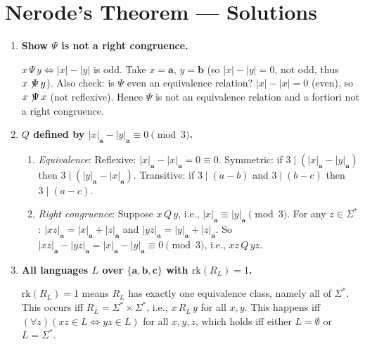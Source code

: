 \chapter{Nerode's Theorem --- Solutions}

\begin{enumerate}[{2.}1.]

\item \textbf{Show $\Psi$ is not a right congruence.}

$x\,\Psi\,y \Leftrightarrow |x|-|y|$ is odd. Take $x=\mathbf{a}$, $y=\mathbf{b}$ (so $|x|-|y|=0$, not odd, thus $x\not\!\Psi\,y$). Also check: is $\Psi$ even an equivalence relation? $|x|-|x|=0$ (even), so $x\not\!\Psi\,x$ (not reflexive). Hence $\Psi$ is not an equivalence relation and a fortiori not a right congruence.

\item \textbf{$Q$ defined by $|x|_\mathbf{a}-|y|_\mathbf{a}\equiv 0\pmod{3}$.}

\begin{enumerate}
\item \textit{Equivalence}: Reflexive: $|x|_\mathbf{a}-|x|_\mathbf{a}=0\equiv 0$. Symmetric: if $3\mid(|x|_\mathbf{a}-|y|_\mathbf{a})$ then $3\mid(|y|_\mathbf{a}-|x|_\mathbf{a})$. Transitive: if $3\mid(a-b)$ and $3\mid(b-c)$ then $3\mid(a-c)$.

\item \textit{Right congruence}: Suppose $x\,Q\,y$, i.e., $|x|_\mathbf{a}\equiv|y|_\mathbf{a}\pmod{3}$. For any $z\in\Sigma^*$:
$|xz|_\mathbf{a}=|x|_\mathbf{a}+|z|_\mathbf{a}$ and $|yz|_\mathbf{a}=|y|_\mathbf{a}+|z|_\mathbf{a}$. So $|xz|_\mathbf{a}-|yz|_\mathbf{a}=|x|_\mathbf{a}-|y|_\mathbf{a}\equiv 0\pmod{3}$, i.e., $xz\,Q\,yz$.
\end{enumerate}

\item \textbf{All languages $L$ over $\{\mathbf{a},\mathbf{b},\mathbf{c}\}$ with $\mathrm{rk}(R_L)=1$.}

$\mathrm{rk}(R_L)=1$ means $R_L$ has exactly one equivalence class, namely all of $\Sigma^*$. This occurs iff $R_L = \Sigma^*\times\Sigma^*$, i.e., $x\,R_L\,y$ for all $x,y$. This happens iff $(\forall z)(xz\in L\Leftrightarrow yz\in L)$ for all $x,y,z$, which holds iff either $L=\emptyset$ or $L=\Sigma^*$.


\end{enumerate}
